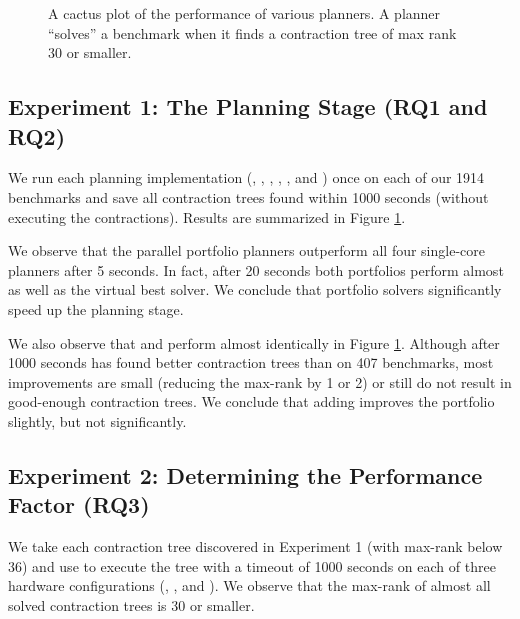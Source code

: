 \begin{figure}
	\centering
	
    \vspace*{-0.7cm}
	\caption{\label{fig:parallel:planning} A cactus plot of the performance of various planners. A planner ``solves'' a benchmark when it finds a contraction tree of max rank 30 or smaller.}
\end{figure}

\subsection{Experiment 1: The Planning Stage (RQ1 and RQ2)}
We run each planning implementation (, , , , , and ) once on each of our 1914 benchmarks and save all contraction trees found within 1000 seconds (without executing the contractions). Results are summarized in Figure \ref{fig:parallel:planning}. 


%


We observe that the parallel portfolio planners outperform all four single-core planners after 5 seconds. In fact, after 20 seconds both portfolios perform almost as well as the virtual best solver. We conclude that portfolio solvers significantly speed up the planning stage.

We also observe that  and  perform almost identically in Figure \ref{fig:parallel:planning}. Although after 1000 seconds  has found better contraction trees than  on 407 benchmarks, most improvements are small (reducing the max-rank by 1 or 2) or still do not result in good-enough contraction trees. We conclude that adding  improves the portfolio slightly, but not significantly.
 
\subsection{Experiment 2: Determining the Performance Factor (RQ3)}
\label{sec:experiments:pf}
We take each contraction tree discovered in Experiment 1 (with max-rank below 36) and use  to execute the tree with a timeout of 1000 seconds on each of three hardware configurations (, , and ). We observe that the max-rank of almost all solved contraction trees is 30 or smaller.

